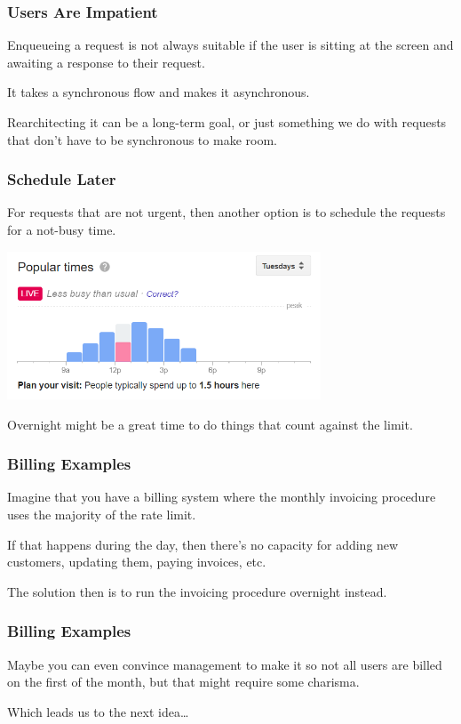 \begin{frame}
\frametitle{Users Are Impatient}

Enqueueing a request is not always suitable if the user is sitting at the screen and awaiting a response to their request.

It takes a synchronous flow and makes it asynchronous.

Rearchitecting it can be a long-term goal, or just something we do with requests that don't have to be synchronous to make room.

\end{frame}

\begin{frame}
\frametitle{Schedule Later}

For requests that are not urgent, then another option is to schedule the requests for a not-busy time.

\begin{center}
  \includegraphics[width=0.7\textwidth]{images/popular-times.png}
\end{center}

Overnight might be a great time to do things that count against the limit.

\end{frame}

\begin{frame}
\frametitle{Billing Examples}

Imagine that you have a billing system where the monthly invoicing procedure uses the majority of the rate limit. 

If that happens during the day, then there's no capacity for adding new customers, updating them, paying invoices, etc. 

The solution then is to run the invoicing procedure overnight instead.

\end{frame}

\begin{frame}
\frametitle{Billing Examples}

Maybe you can even convince management to make it so not all users are billed on the first of the month, but that might require some charisma.


Which leads us to the next idea\ldots

\end{frame}

